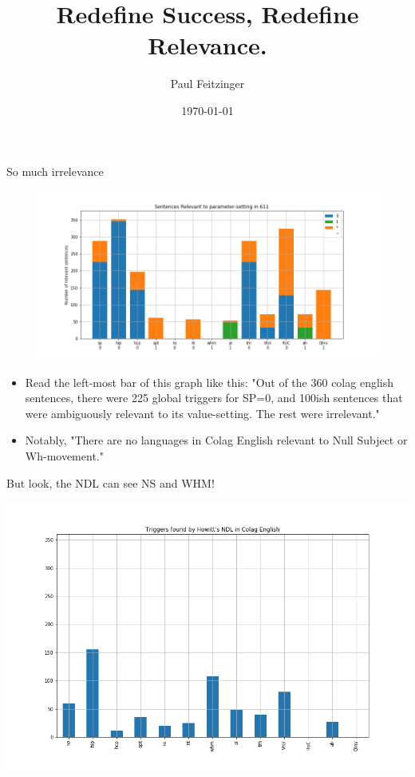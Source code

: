 \documentclass[presentation]{beamer}
\author{Paul Feitzinger}
\date{\today}
\title{Redefine Success, Redefine Relevance.}
\begin{document}
\maketitle

\begin{frame}[label={sec:org543d9ec}]{So much irrelevance}
\begin{figure}[htbp]
\centering
\includegraphics[width=.9\linewidth]{./images/english-triggers.png}
\end{figure}
\begin{itemize}
\item Read the left-most bar of this graph like this: "Out of the 360 colag
english sentences, there were 225 global triggers for SP=0, and 100ish
sentences that were ambiguously relevant to its value-setting. The rest were
irrelevant."
\item Notably, "There are no languages in Colag English relevant to Null Subject
or Wh-movement."
\end{itemize}
\end{frame}
\begin{frame}[label={sec:org27051ad}]{But look, the NDL can see NS and WHM!}
\begin{center}
\includegraphics[width=.9\linewidth]{./images/ndl-triggers.png}
\end{center}
\end{frame}
\end{document}
